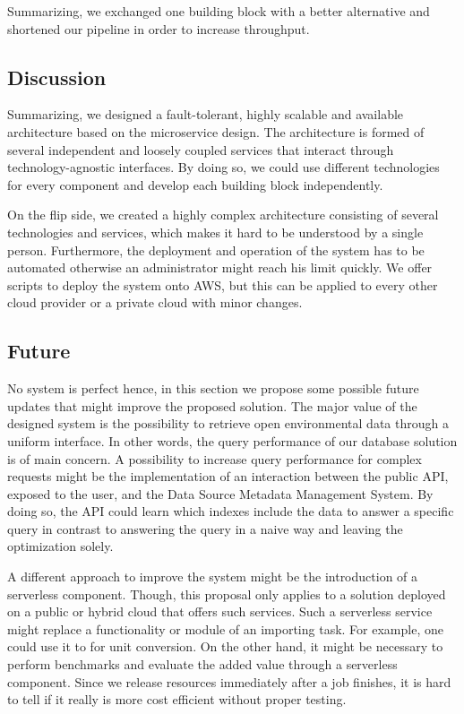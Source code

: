Summarizing, we exchanged one building block with a better alternative
and shortened our pipeline in order to increase throughput.

\subsection{Discussion}\label{discussion}

Summarizing, we designed a fault-tolerant, highly scalable and available
architecture based on the microservice design. The architecture is
formed of several independent and loosely coupled services that interact
through technology-agnostic interfaces. By doing so, we could use
different technologies for every component and develop each building
block independently.

On the flip side, we created a highly complex architecture consisting of
several technologies and services, which makes it hard to be understood
by a single person. Furthermore, the deployment and operation of the
system has to be automated otherwise an administrator might reach his
limit quickly. We offer scripts to deploy the system onto AWS, but this
can be applied to every other cloud provider or a private cloud with
minor changes.

\subsection{Future}\label{future}

No system is perfect hence, in this section we propose some possible
future updates that might improve the proposed solution. The major value
of the designed system is the possibility to retrieve open environmental
data through a uniform interface. In other words, the query performance
of our database solution is of main concern. A possibility to increase
query performance for complex requests might be the implementation of an
interaction between the public API, exposed to the user, and the Data
Source Metadata Management System. By doing so, the API could learn
which indexes include the data to answer a specific query in contrast to
answering the query in a naive way and leaving the optimization solely.

A different approach to improve the system might be the introduction of
a serverless component. Though, this proposal only applies to a solution
deployed on a public or hybrid cloud that offers such services. Such a
serverless service might replace a functionality or module of an
importing task. For example, one could use it to for unit conversion. On
the other hand, it might be necessary to perform benchmarks and evaluate
the added value through a serverless component. Since we release
resources immediately after a job finishes, it is hard to tell if it
really is more cost efficient without proper testing.
